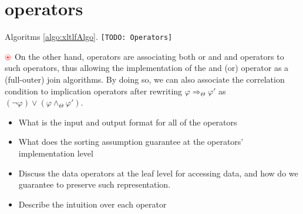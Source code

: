 \section{\xLTLf operators}\label{sec:xltlf}
Algoritms \ref{algo:xltlfAlgo}. \texttt{\color{red}[TODO: \xLTLf Operators]} 

\begin{mdframed}[hidealllines=true,backgroundcolor=orange!20]
	{$\color{red}\ostar$} On the other hand, \xLTLf operators are associating both or and and operators to such operators, thus allowing the implementation of the and (or) operator as a (full-outer) join algorithms. By doing so, we can also associate the correlation condition to implication operators after rewriting $\varphi\Rightarrow_\Theta\varphi'$ as $(\neg\varphi)\vee(\varphi\wedge_\Theta\varphi')$.
\end{mdframed}

\begin{itemize}
	\item What is the input and output format for all of the operators
	\item What does the sorting assumption guarantee at the operators' implementation level
	\item Discuss the data operators at the leaf level for accessing data, and how do we guarantee to preserve such representation.
	\item Describe the intuition over each operator
\end{itemize}